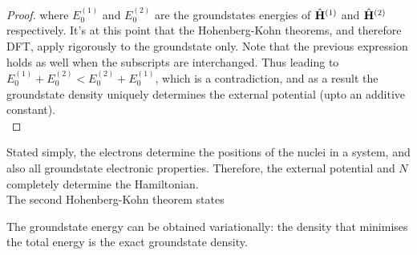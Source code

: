 \documentclass{homework}
\begin{document}
\begin{proof}
where $E_{0}^{(1)}$ and $E_{0}^{(2)}$ are the groundstates energies of $\hat{\bf H}^{(1)}$ and $\hat{\bf H}^{(2)}$ respectively. It's at this point that the Hohenberg-Kohn theorems, and therefore DFT, apply rigorously to the groundstate only. Note that the previous expression holds as well when the subscripts are interchanged. Thus leading to $ E_{0}^{(1)} +  E_{0}^{(2)} <  E_{0}^{(2)} +  E_{0}^{(1)}$, which is a contradiction, and as a result the groundstate density uniquely determines the external potential (upto an additive constant). \\
\end{proof}

Stated simply, the electrons determine the positions of the nuclei in a system, and also all groundstate electronic properties. Therefore, the external potential and $N$ completely determine the Hamiltonian. \\

The second Hohenberg-Kohn theorem states 

\begin{theo}
\end{theo}
The groundstate energy can be obtained variationally: the density that minimises the total energy is the exact groundstate density. 
\end{document}
